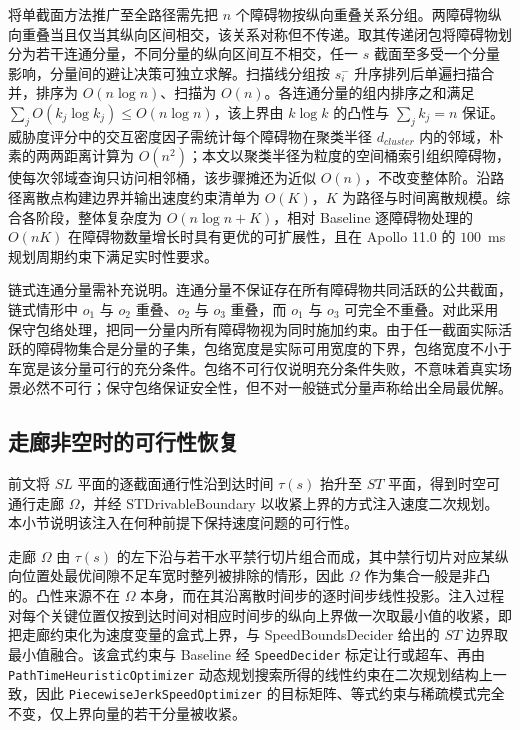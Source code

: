 \documentclass[a4paper,11pt]{ctexart}
\theoremstyle{definition}
\begin{document}
将单截面方法推广至全路径需先把 $n$ 个障碍物按纵向重叠关系分组。两障碍物纵向重叠当且仅当其纵向区间相交，该关系对称但不传递。取其传递闭包将障碍物划分为若干连通分量，不同分量的纵向区间互不相交，任一 $s$ 截面至多受一个分量影响，分量间的避让决策可独立求解。扫描线分组按 $s_i^{-}$ 升序排列后单遍扫描合并，排序为 $O(n \log n)$、扫描为 $O(n)$。各连通分量的组内排序之和满足 $\sum_j O(k_j \log k_j) \leq O(n \log n)$，该上界由 $k \log k$ 的凸性与 $\sum_j k_j = n$ 保证。威胁度评分中的交互密度因子需统计每个障碍物在聚类半径 $d_{cluster}$ 内的邻域，朴素的两两距离计算为 $O(n^2)$；本文以聚类半径为粒度的空间桶索引组织障碍物，使每次邻域查询只访问相邻桶，该步骤摊还为近似 $O(n)$，不改变整体阶。沿路径离散点构建边界并输出速度约束清单为 $O(K)$，$K$ 为路径与时间离散规模。综合各阶段，整体复杂度为 $O(n \log n + K)$，相对 Baseline 逐障碍物处理的 $O(nK)$ 在障碍物数量增长时具有更优的可扩展性，且在 Apollo 11.0 的 $100$~ms 规划周期约束下满足实时性要求。

链式连通分量需补充说明。连通分量不保证存在所有障碍物共同活跃的公共截面，链式情形中 $o_1$ 与 $o_2$ 重叠、$o_2$ 与 $o_3$ 重叠，而 $o_1$ 与 $o_3$ 可完全不重叠。对此采用保守包络处理，把同一分量内所有障碍物视为同时施加约束。由于任一截面实际活跃的障碍物集合是分量的子集，包络宽度是实际可用宽度的下界，包络宽度不小于车宽是该分量可行的充分条件。包络不可行仅说明充分条件失败，不意味着真实场景必然不可行；保守包络保证安全性，但不对一般链式分量声称给出全局最优解。

\subsection{走廊非空时的可行性恢复}
\label{sec:thy_feasibility}

前文将 $SL$ 平面的逐截面通行性沿到达时间 $\tau(s)$ 抬升至 $ST$ 平面，得到时空可通行走廊 $\Omega$，并经 STDrivableBoundary 以收紧上界的方式注入速度二次规划。本小节说明该注入在何种前提下保持速度问题的可行性。

走廊 $\Omega$ 由 $\tau(s)$ 的左下沿与若干水平禁行切片组合而成，其中禁行切片对应某纵向位置处最优间隙不足车宽时整列被排除的情形，因此 $\Omega$ 作为集合一般是非凸的。凸性来源不在 $\Omega$ 本身，而在其沿离散时间步的逐时间步线性投影。注入过程对每个关键位置仅按到达时间对相应时间步的纵向上界做一次取最小值的收紧，即把走廊约束化为速度变量的盒式上界，与 SpeedBoundsDecider 给出的 $ST$ 边界取最小值融合。该盒式约束与 Baseline 经 \texttt{SpeedDecider} 标定让行或超车、再由 \texttt{PathTimeHeuristicOptimizer} 动态规划搜索所得的线性约束在二次规划结构上一致，因此 \texttt{PiecewiseJerkSpeedOptimizer} 的目标矩阵、等式约束与稀疏模式完全不变，仅上界向量的若干分量被收紧。
\end{document}

